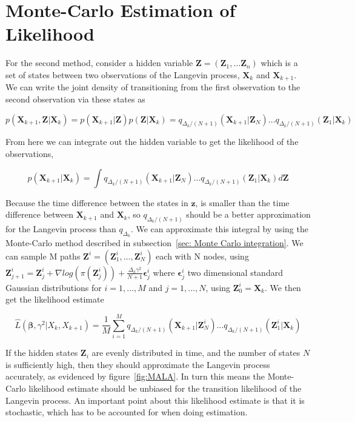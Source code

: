 \section{Monte-Carlo Estimation of Likelihood}
\label{sec: Monte-Carlo Estimation}
For the second method, consider a hidden variable $\textbf{Z} = (\textbf{Z}_1, \dots \textbf{Z}_n)$ which is a set of states between two  observations of the Langevin process, $\textbf{X}_k$ and $\textbf{X}_{k+1}$. We can write the joint density of transitioning from the first observation to the second observation via these states as 

$$p(\textbf{X}_{k+1}, \textbf{Z} | \textbf{X}_k) = p(\textbf{X}_{k+1}|\textbf{Z})p(\textbf{Z}|\textbf{X}_k) = q_{\Delta_k/(N+1)}(\textbf{X}_{k+1}|\textbf{Z}_N)\dots q_{\Delta_k/(N+1)}(\textbf{Z}_1|\textbf{X}_k)$$ 

From here we can integrate out the hidden variable to get the likelihood of the observations, 


$$p(\textbf{X}_{k+1}|\textbf{X}_k) = \int q_{\Delta_k/(N+1)}(\textbf{X}_{k+1}|\textbf{Z}_N)\dots q_{\Delta_k/(N+1)}(\textbf{Z}_1|\textbf{X}_k)d\textbf{Z}$$

Because the time difference between the states in $\textbf{z}$, is smaller than the time difference between $\textbf{X}_{k+1}$ and $\textbf{X}_k$, so $q_{\Delta_k/(N+1)}$ should be a better approximation for the Langevin process than $q_{\Delta_k}$. We can approximate this integral by using the Monte-Carlo method described in subsection~\ref{sec: Monte Carlo integration}. We can sample M paths $\textbf{Z}^i = (\textbf{Z}_1^i, \dots,\textbf{Z}_N^i)$ each with N nodes, using $\textbf{Z}_{j+1}^i = \textbf{Z}_j^i + \nabla log(\pi(\textbf{Z}_j^i)) + \frac{\Delta_k\gamma^2}{N+1}\bm \epsilon_j^i$ where $\bm \epsilon_j^i$ two dimensional standard Gaussian distributions for $i=1, \dots , M$ and $j = 1,\dots , N$, using $\textbf{Z}_0^i = \textbf{X}_k$. We then get the likelihood estimate

$$
\hat{L}(\bm \beta , \gamma^2|X_k, X_{k+1}) =  \frac{1}{M}\sum_{i=1}^M q_{\Delta_k/(N+1)}(\textbf{X}_{k+1}|\textbf{Z}^i_N)\dots q_{\Delta_k/(N+1)}(\textbf{Z}^i_1|\textbf{X}_k)
\label{eq: montecarlo likelihood}
$$

If the hidden states $\textbf{Z}_i$ are evenly distributed in time, and the number of states $N$ is sufficiently high, then they should approximate the Langevin process accurately, as evidenced by figure~\ref{fig:MALA}. In turn this means the Monte-Carlo likelihood estimate should be unbiased for the transition likelihood of the Langevin process. An important point about this likelihood estimate is that it is stochastic, which has to be accounted for when doing estimation. 

